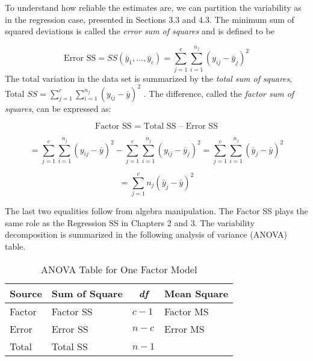 To understand how reliable the estimates are, we can partition the
variability as in the regression case, presented in Sections 3.3 and 4.3.
The minimum sum of squared deviations is called the \textit{error sum of
squares} and is defined to be

\begin{equation*}
\text{Error SS}=SS(\bar{y}_{1},\ldots ,\bar{y}_{c})=\sum_{j=1}^{c}%
\sum_{i=1}^{n_{j}}(y_{ij}-\bar{y}_{j})^{2}
\end{equation*}%
The total variation in the data set is summarized by the \textit{total sum
of squares}, Total $SS=\sum_{j=1}^{c}\sum_{i=1}^{n_{j}}(y_{ij}-\bar{y})^{2}$%
. The difference, called the \textit{factor sum of} \textit{squares}, can be
expressed as:

\begin{equation*}
\text{Factor SS = Total SS -- Error SS}
\end{equation*}

\begin{equation*}
=\sum_{j=1}^{c}\sum_{i=1}^{n_{j}}(y_{ij}-\bar{y})^{2}-\sum_{j=1}^{c}%
\sum_{i=1}^{n_{j}}(y_{ij}-\bar{y}_{j})^{2}=\sum_{j=1}^{c}\sum_{i=1}^{n_{j}}(%
\bar{y}_{j}-\bar{y})^{2}
\end{equation*}

\begin{equation*}
=\sum_{j=1}^{c}n_{j}(\bar{y}_{j}-\bar{y})^{2}
\end{equation*}

The last two equalities follow from algebra manipulation. The Factor
SS plays the same role as the Regression SS in Chapters 2 and 3. The
variability decomposition is summarized in the following analysis of
variance (ANOVA) table.

  \begin{center}  \begin{table}[h]
\caption{\label{T4:ANOVAOneFactor} ANOVA Table for One Factor Model}
\begin{tabular}{cccc}
\hline
Source & Sum of Square & \textit{df} & Mean Square \\ \hline
\multicolumn{1}{l}{Factor} & \multicolumn{1}{l}{Factor SS} &
\multicolumn{1}{l}{$c-1$} & \multicolumn{1}{l}{Factor MS} \\
\multicolumn{1}{l}{Error} & \multicolumn{1}{l}{Error SS} &
\multicolumn{1}{l}{$n-c$} & \multicolumn{1}{l}{Error MS} \\
\multicolumn{1}{l}{Total} & \multicolumn{1}{l}{Total SS} &
\multicolumn{1}{l}{$n-1$} & \multicolumn{1}{l}{} \\ \hline
\end{tabular}

\end{table}  \end{center}  


